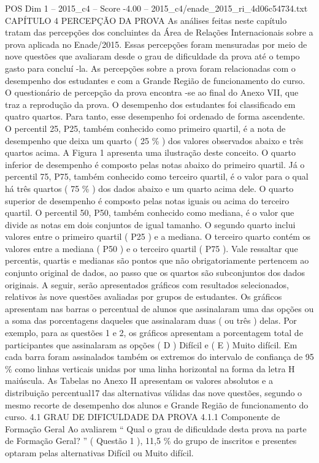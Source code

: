 \begin{textsample}{POS Dim 1 – 2015\_c4 – Score -4.00 – 2015\_c4/enade\_2015\_ri\_4d06c54734.txt}  \label{ex:f1_pos_338}
CAPÍTULO 4 PERCEPÇÃO DA PROVA As análises feitas neste capítulo tratam das percepções dos concluintes da Área de Relações Internacionais sobre a prova aplicada no Enade/2015.
Essas percepções foram mensuradas por meio de nove questões que avaliaram desde o grau de dificuldade da prova até o tempo gasto para concluí -la.
As percepções sobre a prova foram relacionadas com o desempenho dos estudantes e com a Grande Região de funcionamento do curso.
O questionário de percepção da prova encontra -se ao final do Anexo VII, que traz a reprodução da prova.
O desempenho dos estudantes foi classificado em quatro quartos.
Para tanto, esse desempenho foi ordenado de forma ascendente.
O percentil 25, P25, também conhecido como primeiro quartil, é a nota de desempenho que deixa um quarto ( 25 \% ) dos valores observados abaixo e três quartos acima.
A Figura 1 apresenta uma ilustração deste conceito.
O quarto inferior de desempenho é composto pelas notas abaixo do primeiro quartil.
Já o percentil 75, P75, também conhecido como terceiro quartil, é o valor para o qual há três quartos ( 75 \% ) dos dados abaixo e um quarto acima dele.
O quarto superior de desempenho é composto pelas notas iguais ou acima do terceiro quartil.
O percentil 50, P50, também conhecido como mediana, é o valor que divide as notas em dois conjuntos de igual tamanho.
O segundo quarto inclui valores entre o primeiro quartil ( P25 ) e a mediana.
O terceiro quarto contém os valores entre a mediana ( P50 ) e o terceiro quartil ( P75 ).
Vale ressaltar que percentis, quartis e medianas são pontos que não obrigatoriamente pertencem ao conjunto original de dados, ao passo que os quartos são subconjuntos dos dados originais.
A seguir, serão apresentados gráficos com resultados selecionados, relativos às nove questões avaliadas por grupos de estudantes.
Os gráficos apresentam nas barras o percentual de alunos que assinalaram uma das opções ou a soma das porcentagens daqueles que assinalaram duas ( ou três ) delas.
Por exemplo, para as questões 1 e 2, os gráficos apresentam a porcentagem total de participantes que assinalaram as opções ( D ) Difícil e ( E ) Muito difícil.
Em cada barra foram assinalados também os extremos do intervalo de confiança de 95 \% como linhas verticais unidas por uma linha horizontal na forma da letra H maiúscula.
As Tabelas no Anexo II apresentam os valores absolutos e a distribuição percentual17 das alternativas válidas das nove questões, segundo o mesmo recorte de desempenho dos alunos e Grande Região de funcionamento do curso. 4.1 GRAU DE DIFICULDADE DA PROVA 4.1.1 Componente de Formação Geral Ao avaliarem “ Qual o grau de dificuldade desta prova na parte de Formação Geral? ” ( Questão 1 ), 11,5 \% do grupo de inscritos e presentes optaram pelas alternativas Difícil ou Muito difícil.

\end{textsample}
